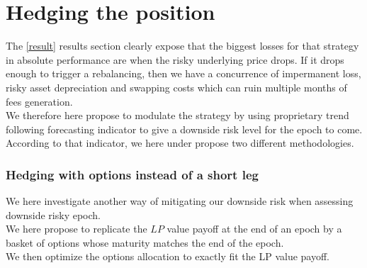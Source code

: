 \documentclass[conference]{IEEEtran}
\begin{document}
\section{Hedging the position}
The \ref{result} results section clearly expose that the biggest losses for that strategy in absolute performance are when the risky underlying price drops. If it drops enough to trigger a rebalancing, then we have a concurrence of impermanent loss, risky asset depreciation and swapping costs which can ruin multiple months of fees generation.\\
We therefore here propose to modulate the strategy by using proprietary trend following forecasting indicator to give a downside risk level for the epoch to come.\\
According to that indicator, we here under propose two different methodologies.


\subsubsection{Hedging with options instead of a short leg}
We here investigate another way of mitigating our downside risk when assessing downside risky epoch.\\
We here propose to replicate the $LP$ value payoff at the end of an epoch by a basket of options whose maturity matches the end of the epoch.\\
We then optimize the options allocation to exactly fit the LP value payoff.\\
\end{document}
